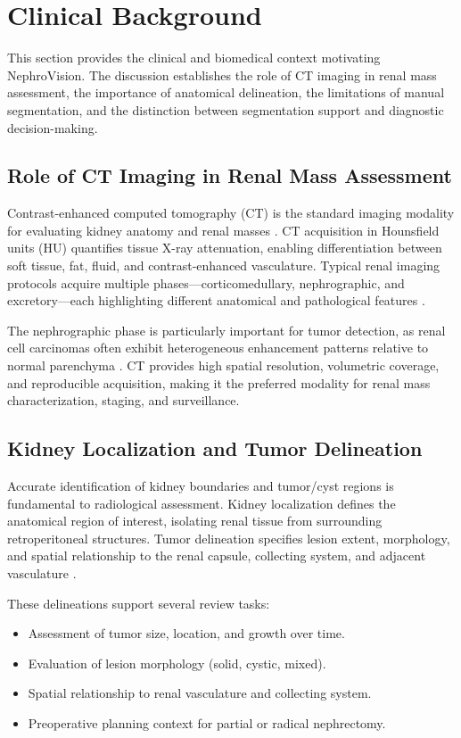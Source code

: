 \section{Clinical Background}

This section provides the clinical and biomedical context motivating NephroVision. The discussion establishes the role of CT imaging in renal mass assessment, the importance of anatomical delineation, the limitations of manual segmentation, and the distinction between segmentation support and diagnostic decision-making.

\subsection{Role of CT Imaging in Renal Mass Assessment}

Contrast-enhanced computed tomography (CT) is the standard imaging modality for evaluating kidney anatomy and renal masses \cite{ct_imaging_kidney}. CT acquisition in Hounsfield units (HU) quantifies tissue X-ray attenuation, enabling differentiation between soft tissue, fat, fluid, and contrast-enhanced vasculature. Typical renal imaging protocols acquire multiple phases---corticomedullary, nephrographic, and excretory---each highlighting different anatomical and pathological features \cite{ct_phases_renal}.

The nephrographic phase is particularly important for tumor detection, as renal cell carcinomas often exhibit heterogeneous enhancement patterns relative to normal parenchyma \cite{renal_cell_carcinoma_imaging}. CT provides high spatial resolution, volumetric coverage, and reproducible acquisition, making it the preferred modality for renal mass characterization, staging, and surveillance.

\subsection{Kidney Localization and Tumor Delineation}

Accurate identification of kidney boundaries and tumor/cyst regions is fundamental to radiological assessment. Kidney localization defines the anatomical region of interest, isolating renal tissue from surrounding retroperitoneal structures. Tumor delineation specifies lesion extent, morphology, and spatial relationship to the renal capsule, collecting system, and adjacent vasculature \cite{renal_anatomy_imaging}.

These delineations support several review tasks:
\begin{itemize}
    \item Assessment of tumor size, location, and growth over time.
    \item Evaluation of lesion morphology (solid, cystic, mixed).
    \item Spatial relationship to renal vasculature and collecting system.
    \item Preoperative planning context for partial or radical nephrectomy.
\end{itemize}

